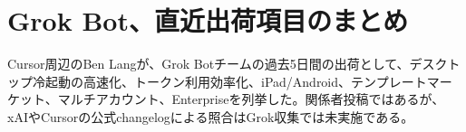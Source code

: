 \section{Grok Bot、直近出荷項目のまとめ}
Cursor周辺のBen Langが、Grok Botチームの過去5日間の出荷として、デスクトップ冷起動の高速化、トークン利用効率化、iPad/Android、テンプレートマーケット、マルチアカウント、Enterpriseを列挙した。関係者投稿ではあるが、xAIやCursorの公式changelogによる照合はGrok収集では未実施である。
